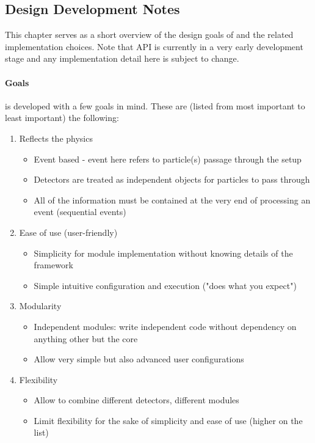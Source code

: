 \subsection{Design Development Notes}
This chapter serves as a short overview of the design goals of \apsq and the related implementation choices. Note that \apsq API is currently in a very early development stage and any implementation detail here is subject to change.

\paragraph{Goals}
\apsq is developed with a few goals in mind. These are (listed from most important to least important) the following:
\begin{enumerate}
    \item Reflects the physics
    \begin{itemize}
        \item Event based - event here refers to particle(s) passage through the setup
        \item Detectors are treated as independent objects for particles to pass through
        \item All of the information must be contained at the very end of processing an event (sequential events)
    \end{itemize}
    \item Ease of use (user-friendly)
    \begin{itemize}
        \item Simplicity for module implementation without knowing details of the framework
        \item Simple intuitive configuration and execution ("does what you expect")
    \end{itemize}
    \item Modularity
    \begin{itemize}
        \item Independent modules: write independent code without dependency on anything other but the core
        \item Allow very simple but also advanced user configurations
    \end{itemize}
    \item Flexibility
    \begin{itemize}
        \item Allow to combine different detectors, different modules
        \item Limit flexibility for the sake of simplicity and ease of use (higher on the list)
    \end{itemize}
\end{enumerate}

